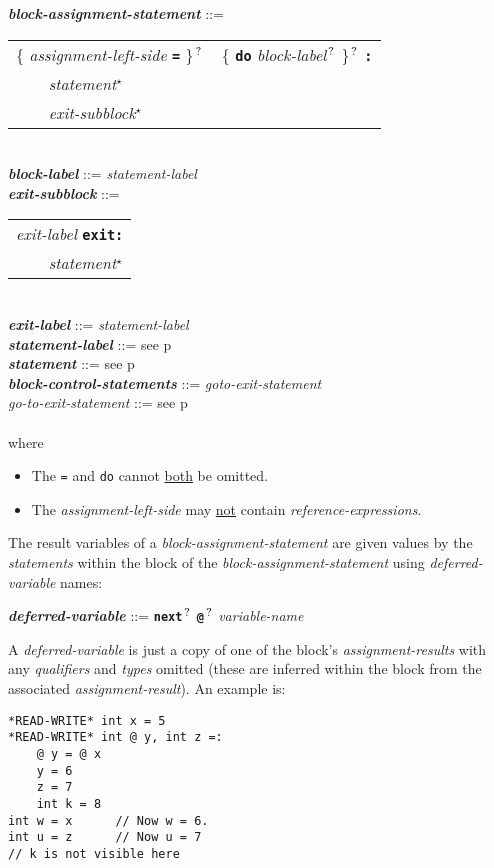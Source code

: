 \documentclass[12pt]{article}
\newcommand{\TT}[1]{{\tt \bfseries #1}}
\newcommand{\STAR}{{\Large $^\star$}}
\newcommand{\QMARK}{{$^{\,\mbox{\footnotesize ?}}$}}
\newcommand{\ttkey}[1]{{\tt \bfseries #1}}
\newcommand{\emkey}[1]{{\em \bfseries #1}}
\newcommand{\pagref}[1]{p\pageref{#1}}
\newenvironment{indpar}[1][0.3in]%
	{\begin{list}{}%
		     {\setlength{\itemsep}{0in}%
		      \setlength{\topsep}{0in}%
		      \setlength{\parsep}{1ex}%
		      \setlength{\labelwidth}{#1}%
		      \setlength{\leftmargin}{#1}%
		      \addtolength{\leftmargin}{\labelsep}}%
	 \item}%
	{\end{list}}
\begin{document}
\begin{indpar}
\emkey{block-assignment-statement} ::= \\
\hspace*{0.5in}\begin{tabular}[t]{l}
        \{ {\em assignment-left-side} \TT{=} \}\QMARK{}
	~ \{ \ttkey{do} {\em block-label}\QMARK{} \}\QMARK{}
	\TT{:} \\
	\TT{~~~~}{\em statement}\STAR{} \\
	\TT{~~~~}{\em exit-subblock}\STAR{}
	\end{tabular} \\
\emkey{block-label} ::= {\em statement-label}
\\[0.5ex]
\emkey{exit-subblock} ::=
    \begin{tabular}[t]{l}
    {\em exit-label} \ttkey{exit}\TT{:} \\
    \TT{~~~~}{\em statement}\STAR{} \\
    \end{tabular} \\
\emkey{exit-label} ::= {\em statement-label}
\\[0.5ex]
\emkey{statement-label} ::= see \pagref{STATEMENT-LABEL} \\
\emkey{statement} ::= see \pagref{STATEMENT} \\
\emkey{block-control-statements}\label{BLOCK-CONTROL-STATEMENTS}
	::= {\em goto-exit-statement} \\
{\em go-to-exit-statement} ::= see \pagref{GO-TO-STATEMENT} \\
\\[1ex]
where
\begin{itemize}
\item The {\tt =} and {\tt do} cannot \underline{both} be omitted.
\item The {\em assignment-left-side} may \underline{not} contain
{\em reference-expressions}.
\end{itemize}
\end{indpar}

The result variables of a {\em block-assignment-statement}
are given values by the {\em statements} within the block
of the {\em block-assignment-statement} using {\em deferred-variable}
names:
\begin{indpar}
\emkey{deferred-variable}\label{DEFERRED-VARIABLE} ::=
    \TT{next}\QMARK{} \TT{@}\QMARK{} {\em variable-name}
\end{indpar}
A {\em deferred-variable} is just a copy of one of the
block's {\em assignment-results} with any {\em qualifiers}
and {\em types} omitted (these are inferred within the block
from the associated {\em assignment-result}).  An example is:
\begin{indpar}\begin{verbatim}
*READ-WRITE* int x = 5
*READ-WRITE* int @ y, int z =:
    @ y = @ x
    y = 6
    z = 7
    int k = 8
int w = x      // Now w = 6.
int u = z      // Now u = 7
// k is not visible here
\end{verbatim}\end{indpar}
\end{document}
